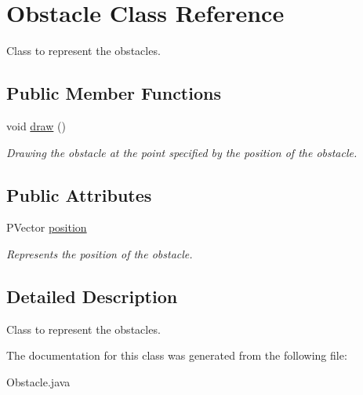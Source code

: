\hypertarget{class_obstacle}{}\section{Obstacle Class Reference}
\label{class_obstacle}


Class to represent the obstacles.  


\subsection*{Public Member Functions}
\begin{DoxyCompactItemize}
\item 
\mbox{\label{class_obstacle_adc3b7cfc70a44966762be98d925f57d2}} 
void \mbox{\hyperlink{class_obstacle_adc3b7cfc70a44966762be98d925f57d2}{draw}} ()
\begin{DoxyCompactList}\small\item\em Drawing the obstacle at the point specified by the position of the obstacle. \end{DoxyCompactList}\end{DoxyCompactItemize}
\subsection*{Public Attributes}
\begin{DoxyCompactItemize}
\item 
\mbox{\label{class_obstacle_a22499e4a7cba1620dac16e0945275bb0}} 
P\+Vector \mbox{\hyperlink{class_obstacle_a22499e4a7cba1620dac16e0945275bb0}{position}}
\begin{DoxyCompactList}\small\item\em Represents the position of the obstacle. \end{DoxyCompactList}\end{DoxyCompactItemize}


\subsection{Detailed Description}
Class to represent the obstacles. 

The documentation for this class was generated from the following file\+:\begin{DoxyCompactItemize}
\item 
Obstacle.\+java\end{DoxyCompactItemize}
